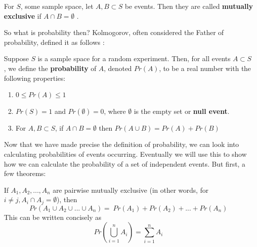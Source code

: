 \begin{defn}
For $S$, some sample space, let $A, B \subset S$ be events. Then they are called \textbf{mutually exclusive}
if $A \cap B = \emptyset$ \cite[p.~58]{IntroStat}.
\end{defn}

So what is probability then? Kolmogorov, often considered the Father of
probability, defined it as follows \cite[p.~60]{IntroStat}:

\begin{defn}
Suppose $S$ is a sample space for a random experiment. Then, for all events
$A \subset S$, we define the \textbf{probability} of $A$, denoted $Pr(A)$, to be a real
number with the following properties:
\begin{enumerate}
\item $0 \leq Pr(A) \leq 1$
\item $Pr(S) = 1$ and $Pr(\emptyset) = 0$, where $\emptyset$ is the empty set or \textbf{null event}.
\item For $A, B \subset S$, if $A \cap B = \emptyset$ then $Pr(A \cup B) = Pr(A) + Pr(B)$
\end{enumerate}
\end{defn}

Now that we have made precise the definition of probability, we can look
into calculating probabilities of events occurring. Eventually we will
use this to show how we can calculate the probability of a set of 
independent events. But first, a few theorems:

\begin{thm}
If $A_1, A_2, ... ,A_n$ are pairwise mutually
exclusive (in other words, for $i \neq j, A_i \cap A_j = \emptyset$), then
\begin{equation}
    Pr(A_1 \cup A_2 \cup ... \cup A_n) = \
    Pr(A_1) + Pr(A_2) + ... + Pr(A_n)
\end{equation}
This can be written concisely as
\begin{equation}
    Pr\left(\bigcup _{i=1}^nA_i\right) = \sum _{i=1}^nA_i 
\end{equation}
\end{thm}

